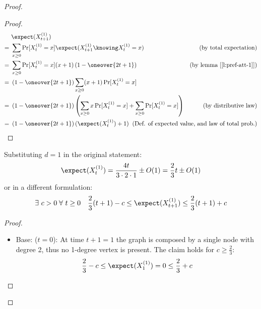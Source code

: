 \begin{proof}
    \begin{proof}
        \begin{align*}
             &\ \expect(X_{t + 1}^{(1)})                                                            & \\
            =&\ \sum_{x \geq 0} \Pr[X_t^{(1)} = x] \expect(X_{t + 1}^{(1)} \knowing X_t^{(1)} = x)  & \text{(by total expectation)} \\
            =&\ \sum_{x \geq 0} \Pr[X_t^{(1)} = x] (x + 1) \left( 1 - \oneover{2t + 1} \right)      & \text{(by lemma [\ref{l:pref-att-1}])} \\
            =&\ \left( 1 - \oneover{2t + 1} \right) \sum_{x \geq 0} (x + 1) \Pr[X_t^{(1)} = x]      & \\
            =&\ \left( 1 - \oneover{2t + 1} \right) \left( \sum_{x \geq 0} x \Pr[X_t^{(1)} = x] + \sum_{x \geq 0} \Pr[X_t^{(1)} = x] \right)    & \text{(by distributive law)} \\
            =&\ \left( 1 - \oneover{2t + 1} \right) (\expect(X_t^{(1)}) + 1)                        & \mathllap{\text{(Def. of expected value, and law of total prob.)}}
        \end{align*}
    \end{proof}

    \begin{lemma}\label{l:pref-att-3} Substituting $d = 1$ in the original statement:
        \[
            \expect(X_t^{(1)}) = \frac{4 t}{3 \cdot 2 \cdot 1} \pm O(1) = \frac{2}{3} t \pm O(1)
        \]
        or in a different formulation:
        \[
            \exists\ c > 0\; \forall\ t\geq 0 \quad \frac{2}{3} (t + 1) - c \leq \expect( X_{t + 1}^{(1)} ) \leq \frac{2}{3} (t + 1) + c
        \]
    \end{lemma}

    \begin{proof}

        \begin{itemize}
            \item Base: ($t = 0$): At time $t + 1 = 1$ the graph is composed by a single node with degree 2, thus no 1-degree vertex is present. The claim holds for $c \geq \frac{2}{3}$:
            \[
                \frac{2}{3} - c \leq \expect(X_1^{(1)}) = 0 \leq \frac{2}{3} + c
            \]


\end{itemize}
\end{proof}
\end{proof}

